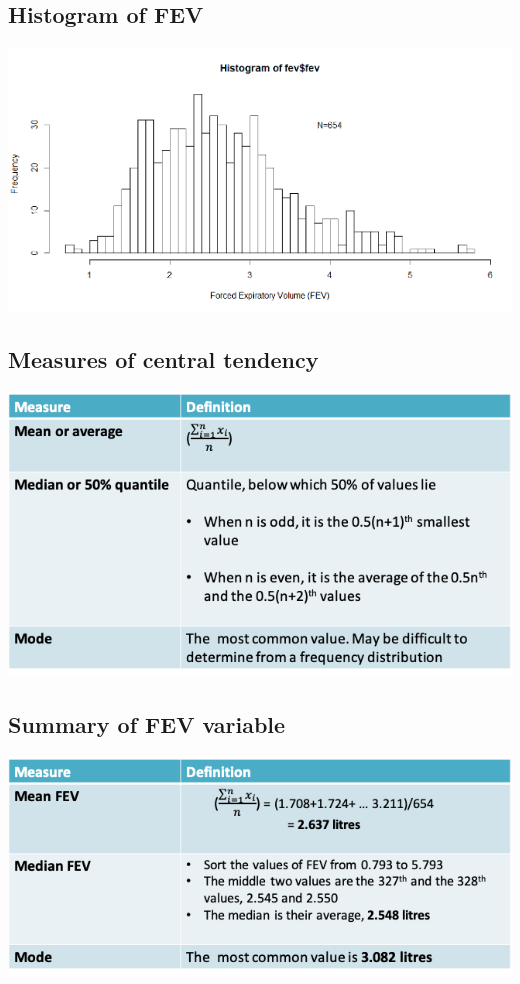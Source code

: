 \documentclass[
]{book}
\begin{document}
\hypertarget{histogram-of-fev}{%
\subsection{Histogram of FEV}\label{histogram-of-fev}}

\includegraphics[width=0.5\linewidth]{./3_6}

\hypertarget{measures-of-central-tendency}{%
\subsection{Measures of central tendency}\label{measures-of-central-tendency}}

\includegraphics[width=1\linewidth]{./3_7}

\hypertarget{summary-of-fev-variable}{%
\subsection{Summary of FEV variable}\label{summary-of-fev-variable}}

\includegraphics[width=1\linewidth]{./3_8}
\end{document}
